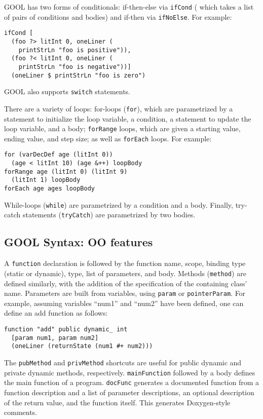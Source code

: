 \documentclass[sigplan,review,anonymous,prologue,dvipsnames]{acmart}
\begin{document}
GOOL has two forms of conditionals: if-then-else via \verb|ifCond| (
which takes a list of pairs of conditions and bodies) and
if-then via \verb|ifNoElse|.  For example:
\begin{lstlisting}
ifCond [
  (foo ?> litInt 0, oneLiner (
    printStrLn "foo is positive")),
  (foo ?< litInt 0, oneLiner (
    printStrLn "foo is negative"))]
  (oneLiner $ printStrLn "foo is zero")
\end{lstlisting}
GOOL also supports \verb|switch| statements.

There are a variety of loops: for-loops (\verb|for|), which are
parametrized by a statement to
initialize the loop variable, a condition, a statement to update the loop
variable, and a body; \verb|forRange| loops, which are given a
starting value, ending value, and step size; as well as \verb|forEach|
loops.
For example:
\begin{lstlisting}
for (varDecDef age (litInt 0))
  (age < litInt 10) (age &++) loopBody
forRange age (litInt 0) (litInt 9)
  (litInt 1) loopBody
forEach age ages loopBody
\end{lstlisting}
While-loops (\verb|while|) are parametrized by a condition and a body. Finally,
try-catch statements (\verb|tryCatch|) are parametrized by two bodies.

\subsection{GOOL Syntax: OO features}

A \verb|function| declaration is followed by the function
name, scope, binding type (static or dynamic), type, list of parameters, and
body. Methods (\verb|method|) are defined similarly, with the addition of the
specification of the containing class' name.  Parameters are built from
variables, using \verb|param| or \verb|pointerParam|. For example, assuming
variables ``num1'' and ``num2'' have been defined, one can define an
\textsf{add} function as follows:
\begin{lstlisting}
function "add" public dynamic_ int
  [param num1, param num2]
  (oneLiner (returnState (num1 #+ num2)))
\end{lstlisting}
The  \verb|pubMethod| and \verb|privMethod| shortcuts are useful for public
dynamic and private dynamic methods, respectively. \verb|mainFunction|
followed by a body defines the main function of a program. \verb|docFunc|
generates a documented function from a function description and
a list of parameter descriptions, an optional description of the return
value, and the function itself.  This generates Doxygen-style comments.
\end{document}
